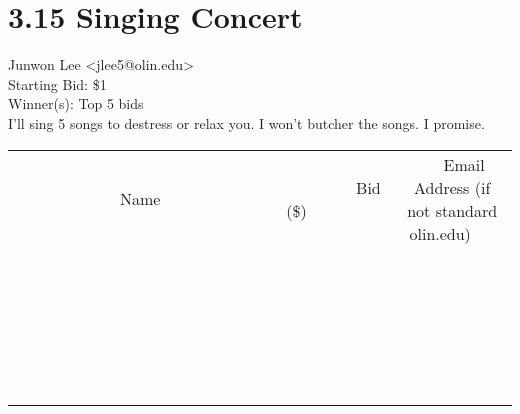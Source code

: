 \documentclass[11pt]{article}
\begin{document}
					\section*{3.15 Singing Concert}
					Junwon Lee <jlee5@olin.edu> \\
					Starting Bid: \$1 \\
					Winner(s): Top 5 bids \\
					I'll sing 5 songs to destress or relax you. I won't butcher the songs. I promise. \\
					[6ex]
					\begin{tabular}{c c c}
						~~~~~~~~~~~~~Name~~~~~~~~~~~~~ & ~~~~~~~~~Bid (\$)~~~~~~~~~ & ~~~Email Address (if not standard olin.edu)~~~ \\
				
 & & \\
\hline
 & & \\
\hline
 & & \\
\hline
 & & \\
\hline
 & & \\
\hline
 & & \\
\hline
 & & \\
\hline
 & & \\
\hline
 & & \\
\hline
 & & \\
\hline
 & & \\
\hline
 & & \\
\hline
 & & \\
\hline
 & & \\
\hline
 & & \\
\hline
 & & \\
\hline
 & & \\
\hline
 & & \\
\hline
 & & \\
\hline
 & & \\
\hline
 & & \\
\hline
 & & \\
\hline
 & & \\
\hline
 & & \\
\hline
 & & \\
\hline
 & & \\
\hline
					\end{tabular}
					\clearpage
				
\end{document}
